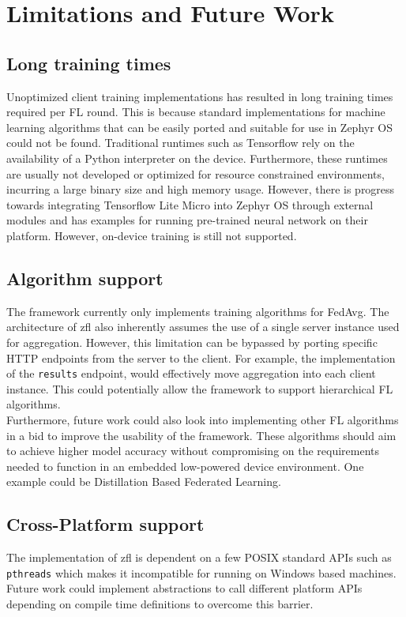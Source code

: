 \documentclass[12pt]{article}
\begin{document}
\pagebreak
\section{Limitations and Future Work}
\subsection{Long training times}
Unoptimized client training implementations has resulted in long training times required per FL
round. This is because standard implementations for machine learning
algorithms that can be easily ported and suitable for use in Zephyr OS could not be found.
Traditional runtimes such as Tensorflow\cite{tensorflow2015-whitepaper} rely on the availability of a Python interpreter on
the device. Furthermore, these runtimes are usually not developed or optimized for resource
constrained environments, incurring a large binary size and high memory usage. However, there is
progress towards integrating Tensorflow Lite Micro into Zephyr OS through external modules
and has examples for running pre-trained neural network on their platform. However, on-device
training is still not supported.

\subsection{Algorithm support}
The framework currently only implements training algorithms for FedAvg. The architecture of zfl also
inherently assumes the use of a single server instance used for aggregation. However, this
limitation can be bypassed by porting specific HTTP endpoints from the server to the client. For
example, the implementation of the \verb|results| endpoint, would effectively move aggregation into
each client instance. This could potentially allow the framework to support hierarchical FL
algorithms\cite{rana_2023_hierarchical}.\\

Furthermore, future work could also look into implementing other FL algorithms in a bid to improve
the usability of the framework. These algorithms should aim to achieve higher model accuracy without
compromising on the requirements needed to function in an embedded low-powered device environment.
One example could be Distillation Based Federated Learning\cite{liu2022efficient}.

\subsection{Cross-Platform support}
The implementation of zfl is dependent on a few POSIX standard APIs such as \verb|pthreads| which makes it incompatible for
running on Windows based machines. Future work could implement abstractions to call different
platform APIs depending on compile time definitions to overcome this barrier.
\end{document}
